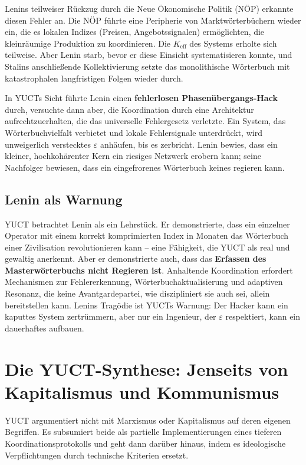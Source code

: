 \documentclass[12pt,a4paper]{article}
\newcommand{\Keff}{K_{\mathrm{eff}}}
\begin{document}
Lenins teilweiser Rückzug durch die Neue Ökonomische Politik (NÖP) erkannte diesen Fehler an. Die NÖP führte eine Peripherie von Marktwörterbüchern wieder ein, die es lokalen Indizes (Preisen, Angebotssignalen) ermöglichten, die kleinräumige Produktion zu koordinieren. Die \(\Keff\) des Systems erholte sich teilweise. Aber Lenin starb, bevor er diese Einsicht systematisieren konnte, und Stalins anschließende Kollektivierung setzte das monolithische Wörterbuch mit katastrophalen langfristigen Folgen wieder durch.

In YUCTs Sicht führte Lenin einen \textbf{fehlerlosen Phasenübergangs-Hack} durch, versuchte dann aber, die Koordination durch eine Architektur aufrechtzuerhalten, die das universelle Fehlergesetz verletzte. Ein System, das Wörterbuchvielfalt verbietet und lokale Fehlersignale unterdrückt, wird unweigerlich verstecktes \(\varepsilon\) anhäufen, bis es zerbricht. Lenin bewies, dass ein kleiner, hochkohärenter Kern ein riesiges Netzwerk erobern kann; seine Nachfolger bewiesen, dass ein eingefrorenes Wörterbuch keines regieren kann.

\subsection{Lenin als Warnung}

YUCT betrachtet Lenin als ein Lehrstück. Er demonstrierte, dass ein einzelner Operator mit einem korrekt komprimierten Index in Monaten das Wörterbuch einer Zivilisation revolutionieren kann – eine Fähigkeit, die YUCT als real und gewaltig anerkennt. Aber er demonstrierte auch, dass das \textbf{Erfassen des Masterwörterbuchs nicht Regieren ist}. Anhaltende Koordination erfordert Mechanismen zur Fehlererkennung, Wörterbuchaktualisierung und adaptiven Resonanz, die keine Avantgardepartei, wie diszipliniert sie auch sei, allein bereitstellen kann. Lenins Tragödie ist YUCTs Warnung: Der Hacker kann ein kaputtes System zertrümmern, aber nur ein Ingenieur, der \(\varepsilon\) respektiert, kann ein dauerhaftes aufbauen.

\section{Die YUCT-Synthese: Jenseits von Kapitalismus und Kommunismus}
\label{sec:yuct-synthesis}

YUCT argumentiert nicht mit Marxismus oder Kapitalismus auf deren eigenen Begriffen. Es subsumiert beide als partielle Implementierungen eines tieferen Koordinationsprotokolls und geht dann darüber hinaus, indem es ideologische Verpflichtungen durch technische Kriterien ersetzt.
\end{document}
